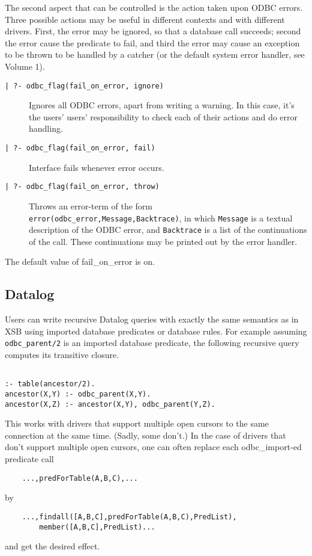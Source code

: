 The second aspect that can be controlled is the action taken upon ODBC
errors.  Three possible actions may be useful in different contexts
and with different drivers.  First, the error may be ignored, so that
a database call succeeds; second the error cause the predicate to
fail, and third the error may cause an exception to be thrown to be
handled by a catcher (or the default system error handler, see Volume
1).
%
\begin{description}
%
\item[\tt | ?- odbc\_flag(fail\_on\_error, ignore)] Ignores all ODBC
errors, apart from writing a warning.  In this case, it's the users'
users' responsibility to check each of their actions and do error
handling.
%
\item[\tt | ?- odbc\_flag(fail\_on\_error, fail)] Interface fails whenever 
error occurs.
%
\item[\tt | ?- odbc\_flag(fail\_on\_error, throw)] Throws an
error-term of the form {\tt error(odbc\_error,Message,Backtrace)}, in
which {\tt Message} is a textual description of the ODBC error, and
{\tt Backtrace} is a list of the continuations of the call.  These
continuations may be printed out by the error handler.
\end{description}
%
The default value of fail\_on\_error is on.


\subsection{Datalog}
Users can write recursive Datalog queries with exactly the same
semantics as in XSB using imported database predicates or database
rules.  For example assuming {\tt odbc\_parent/2} is an imported database
predicate, the following recursive query computes its transitive closure.

\begin{verbatim}

:- table(ancestor/2).
ancestor(X,Y) :- odbc_parent(X,Y).
ancestor(X,Z) :- ancestor(X,Y), odbc_parent(Y,Z).
\end{verbatim}

This works with drivers that support multiple open cursors to the same
connection at the same time.  (Sadly, some don't.)  In the case of
drivers that don't support multiple open cursors, one can often
replace each odbc\_import-ed predicate call
\begin{verbatim}
    ...,predForTable(A,B,C),...
\end{verbatim}
by
\begin{verbatim}
    ...,findall([A,B,C],predForTable(A,B,C),PredList),
        member([A,B,C],PredList)...
\end{verbatim}
and get the desired effect.

